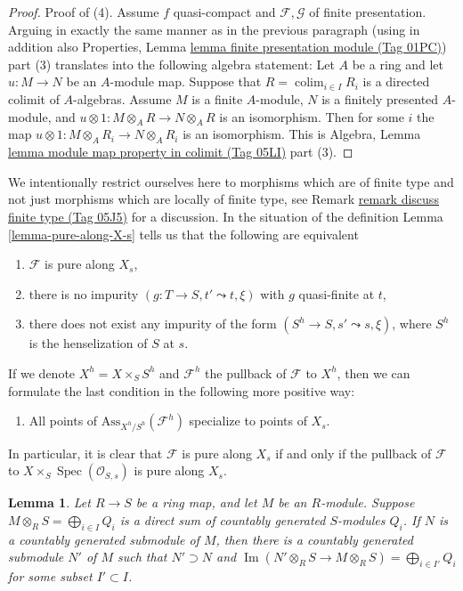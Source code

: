 \documentclass{amsart}
\theoremstyle{plain}
\newtheorem{lemma}[subsection]{Lemma}
\theoremstyle{definition}
\theoremstyle{remark}
\numberwithin{equation}{subsection}
\def\colim{\mathop{\mathrm{colim}}\nolimits}
\def\Spec{\mathop{\mathrm{Spec}}}
\def\Im{\mathop{\mathrm{Im}}}
\begin{document}
\begin{proof}
\medskip\noindent
Proof of (4).
Assume $f$ quasi-compact and $\mathcal{F}, \mathcal{G}$ of finite presentation.
Arguing in exactly the same manner as in the previous paragraph
(using in addition also
Properties, Lemma \href{https://stacks.math.columbia.edu/tag/01PC}{lemma finite presentation module (Tag 01PC)})
part (3) translates into the following algebra statement:
Let $A$ be a ring and let $u : M \to N$ be an $A$-module map.
Suppose that $R = \colim_{i \in I} R_i$ is a directed colimit
of $A$-algebras. Assume $M$ is a finite $A$-module, $N$ is a finitely
presented $A$-module, and
$u \otimes 1 : M \otimes_A R \to N \otimes_A R$ is an isomorphism.
Then for some $i$ the map
$u \otimes 1 : M \otimes_A R_i \to N \otimes_A R_i$ is an isomorphism.
This is
Algebra, Lemma \href{https://stacks.math.columbia.edu/tag/05LI}{lemma module map property in colimit (Tag 05LI)} part (3).
\end{proof}



\noindent
We intentionally restrict ourselves here to morphisms which are
of finite type and not just morphisms which are locally of
finite type, see
Remark \href{https://stacks.math.columbia.edu/tag/05J5}{remark discuss finite type (Tag 05J5)}
for a discussion. In the situation of the definition
Lemma \ref{lemma-pure-along-X-s}
tells us that the following are equivalent
\begin{enumerate}
\item $\mathcal{F}$ is pure along $X_s$,
\item there is no impurity $(g : T \to S, t' \leadsto t, \xi)$ with $g$
quasi-finite at $t$,
\item there does not exist any impurity of the form
$(S^h \to S, s' \leadsto s, \xi)$, where $S^h$ is the henselization
of $S$ at $s$.
\end{enumerate}
If we denote $X^h = X \times_S S^h$ and $\mathcal{F}^h$ the pullback
of $\mathcal{F}$ to $X^h$, then we can formulate the last condition
in the following more positive way:
\begin{enumerate}
\item[(4)] All points of $\text{Ass}_{X^h/S^h}(\mathcal{F}^h)$ specialize
to points of $X_s$.
\end{enumerate}
In particular, it is clear that $\mathcal{F}$ is pure along $X_s$
if and only if the pullback of $\mathcal{F}$ to
$X \times_S \Spec(\mathcal{O}_{S, s})$ is pure along $X_s$.



\begin{lemma}
\label{algebra-lemma-adapted-submodule}
Let $R \to S$ be a ring map, and let $M$ be an $R$-module.  Suppose $M
\otimes_R S = \bigoplus_{i \in I} Q_i$ is a direct sum of countably generated
$S$-modules $Q_i$.  If $N$ is a countably generated submodule of $M$, then
there is a countably generated submodule $N'$ of $M$ such that $N' \supset N$
and $\Im(N' \otimes_R S \to M \otimes_R S) =
\bigoplus_{i \in I'} Q_i$ for some subset $I' \subset I$.
\end{lemma}
\end{document}
